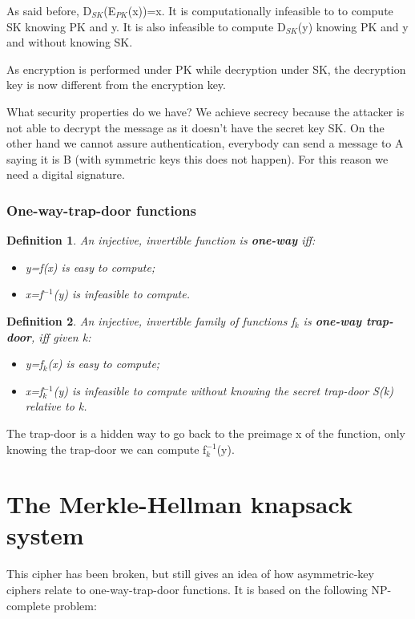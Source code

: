 \documentclass[a4paper, 12pt]{report}
\newtheorem{definition}{\textbf{Definition}}
\begin{document}
As said before, D$_{SK}$(E$_{PK}$(x))=x. It is computationally infeasible to to compute SK knowing PK and y. It is also infeasible to compute D$_{SK}$(y) knowing PK and y and without knowing SK.

As encryption is performed under PK while decryption under SK, the decryption key is now different from the encryption key.

What security properties do we have? We achieve secrecy because the attacker is not able to decrypt the message as it doesn't have the secret key SK. On the other hand we cannot assure authentication, everybody can send a message to A saying it is B (with symmetric keys this does not happen). For this reason we need a digital signature.

\subsubsection{One-way-trap-door functions}
\begin{definition}
	An injective, invertible function is \textbf{one-way} iff:
	\begin{itemize}
		\item y=f(x) is easy to compute;
		\item x=f$^{-1}$(y) is infeasible to compute.
	\end{itemize}
\end{definition}

\begin{definition}
	An injective, invertible family of functions f$_k$ is \textbf{one-way trap-door}, iff given k:
	\begin{itemize}
		\item y=f$_k$(x) is easy to compute;
		\item x=f$_k^{-1}$(y) is infeasible to compute without knowing the secret trap-door S(k) relative to k.
	\end{itemize}
\end{definition}

The trap-door is a hidden way to go back to the preimage x of the function, only knowing the trap-door we can compute f$_k^{-1}$(y).

\section*{The Merkle-Hellman knapsack system}
This cipher has been broken, but still gives an idea of how asymmetric-key ciphers relate to one-way-trap-door functions. It is based on the following NP-complete problem:
\end{document}
